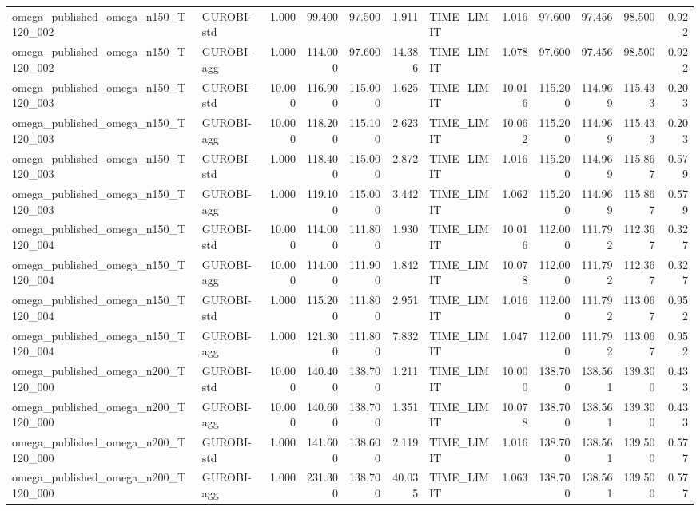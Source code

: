 \begin{table}[htbp]
\begin{tabular}{llrrrrlrrrrr}
omega\_published\_omega\_n150\_T120\_002 & GUROBI-std & 1.000 & 99.400 & 97.500 & 1.911 & TIME\_LIMIT & 1.016 & 97.600 & 97.456 & 98.500 & 0.922 \\
omega\_published\_omega\_n150\_T120\_002 & GUROBI-agg & 1.000 & 114.000 & 97.600 & 14.386 & TIME\_LIMIT & 1.078 & 97.600 & 97.456 & 98.500 & 0.922 \\
omega\_published\_omega\_n150\_T120\_003 & GUROBI-std & 10.000 & 116.900 & 115.000 & 1.625 & TIME\_LIMIT & 10.016 & 115.200 & 114.969 & 115.433 & 0.203 \\
omega\_published\_omega\_n150\_T120\_003 & GUROBI-agg & 10.000 & 118.200 & 115.100 & 2.623 & TIME\_LIMIT & 10.062 & 115.200 & 114.969 & 115.433 & 0.203 \\
omega\_published\_omega\_n150\_T120\_003 & GUROBI-std & 1.000 & 118.400 & 115.000 & 2.872 & TIME\_LIMIT & 1.016 & 115.200 & 114.969 & 115.867 & 0.579 \\
omega\_published\_omega\_n150\_T120\_003 & GUROBI-agg & 1.000 & 119.100 & 115.000 & 3.442 & TIME\_LIMIT & 1.062 & 115.200 & 114.969 & 115.867 & 0.579 \\
omega\_published\_omega\_n150\_T120\_004 & GUROBI-std & 10.000 & 114.000 & 111.800 & 1.930 & TIME\_LIMIT & 10.016 & 112.000 & 111.792 & 112.367 & 0.327 \\
omega\_published\_omega\_n150\_T120\_004 & GUROBI-agg & 10.000 & 114.000 & 111.900 & 1.842 & TIME\_LIMIT & 10.078 & 112.000 & 111.792 & 112.367 & 0.327 \\
omega\_published\_omega\_n150\_T120\_004 & GUROBI-std & 1.000 & 115.200 & 111.800 & 2.951 & TIME\_LIMIT & 1.016 & 112.000 & 111.792 & 113.067 & 0.952 \\
omega\_published\_omega\_n150\_T120\_004 & GUROBI-agg & 1.000 & 121.300 & 111.800 & 7.832 & TIME\_LIMIT & 1.047 & 112.000 & 111.792 & 113.067 & 0.952 \\
omega\_published\_omega\_n200\_T120\_000 & GUROBI-std & 10.000 & 140.400 & 138.700 & 1.211 & TIME\_LIMIT & 10.000 & 138.700 & 138.561 & 139.300 & 0.433 \\
omega\_published\_omega\_n200\_T120\_000 & GUROBI-agg & 10.000 & 140.600 & 138.700 & 1.351 & TIME\_LIMIT & 10.078 & 138.700 & 138.561 & 139.300 & 0.433 \\
omega\_published\_omega\_n200\_T120\_000 & GUROBI-std & 1.000 & 141.600 & 138.600 & 2.119 & TIME\_LIMIT & 1.016 & 138.700 & 138.561 & 139.500 & 0.577 \\
omega\_published\_omega\_n200\_T120\_000 & GUROBI-agg & 1.000 & 231.300 & 138.700 & 40.035 & TIME\_LIMIT & 1.063 & 138.700 & 138.561 & 139.500 & 0.577 \\

\end{tabular}
\end{table}
